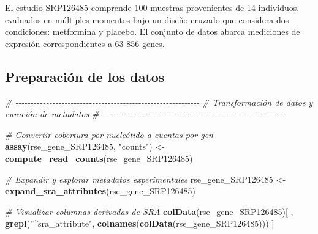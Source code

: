 \documentclass[
  spanish,
  11pt,
]{article}
\newenvironment{Shaded}{\begin{snugshade}}{\end{snugshade}}
\newcommand{\CommentTok}[1]{\textcolor[rgb]{0.56,0.35,0.01}{\textit{#1}}}
\newcommand{\FunctionTok}[1]{\textcolor[rgb]{0.13,0.29,0.53}{\textbf{#1}}}
\newcommand{\NormalTok}[1]{#1}
\newcommand{\OtherTok}[1]{\textcolor[rgb]{0.56,0.35,0.01}{#1}}
\newcommand{\StringTok}[1]{\textcolor[rgb]{0.31,0.60,0.02}{#1}}
\begin{document}
El estudio SRP126485 comprende 100 muestras provenientes de 14
individuos, evaluados en múltiples momentos bajo un diseño cruzado que
considera dos condiciones: metformina y placebo. El conjunto de datos
abarca mediciones de expresión correspondientes a 63 856 genes.

\subsection{Preparación de los datos}\label{preparaciuxf3n-de-los-datos}

\begin{Shaded}
\begin{Highlighting}[]
\CommentTok{\# {-}{-}{-}{-}{-}{-}{-}{-}{-}{-}{-}{-}{-}{-}{-}{-}{-}{-}{-}{-}{-}{-}{-}{-}{-}{-}{-}{-}{-}{-}{-}{-}{-}{-}{-}{-}{-}{-}{-}{-}{-}{-}{-}{-}{-}{-}{-}{-}{-}{-}{-}{-}{-}{-}{-}{-}{-}{-}{-}{-}}
\CommentTok{\# Transformación de datos y curación de metadatos}
\CommentTok{\# {-}{-}{-}{-}{-}{-}{-}{-}{-}{-}{-}{-}{-}{-}{-}{-}{-}{-}{-}{-}{-}{-}{-}{-}{-}{-}{-}{-}{-}{-}{-}{-}{-}{-}{-}{-}{-}{-}{-}{-}{-}{-}{-}{-}{-}{-}{-}{-}{-}{-}{-}{-}{-}{-}{-}{-}{-}{-}{-}{-}}

\CommentTok{\# Convertir cobertura por nucleótido a cuentas por gen}
\FunctionTok{assay}\NormalTok{(rse\_gene\_SRP126485, }\StringTok{"counts"}\NormalTok{) }\OtherTok{\textless{}{-}} 
  \FunctionTok{compute\_read\_counts}\NormalTok{(rse\_gene\_SRP126485)}

\CommentTok{\# Expandir y explorar metadatos experimentales}
\NormalTok{rse\_gene\_SRP126485 }\OtherTok{\textless{}{-}} \FunctionTok{expand\_sra\_attributes}\NormalTok{(rse\_gene\_SRP126485)}

\CommentTok{\# Visualizar columnas derivadas de SRA}
\FunctionTok{colData}\NormalTok{(rse\_gene\_SRP126485)[ ,}
  \FunctionTok{grepl}\NormalTok{(}\StringTok{"\^{}sra\_attribute"}\NormalTok{, }\FunctionTok{colnames}\NormalTok{(}\FunctionTok{colData}\NormalTok{(rse\_gene\_SRP126485)))}
\NormalTok{]}
\end{Highlighting}
\end{Shaded}
\end{document}
